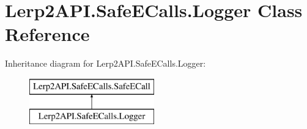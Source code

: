 \hypertarget{class_lerp2_a_p_i_1_1_safe_e_calls_1_1_logger}{}\section{Lerp2\+A\+P\+I.\+Safe\+E\+Calls.\+Logger Class Reference}
\label{class_lerp2_a_p_i_1_1_safe_e_calls_1_1_logger}
Inheritance diagram for Lerp2\+A\+P\+I.\+Safe\+E\+Calls.\+Logger\+:\begin{figure}[H]
\begin{center}
\leavevmode
\includegraphics[height=2.000000cm]{class_lerp2_a_p_i_1_1_safe_e_calls_1_1_logger}
\end{center}
\end{figure}
